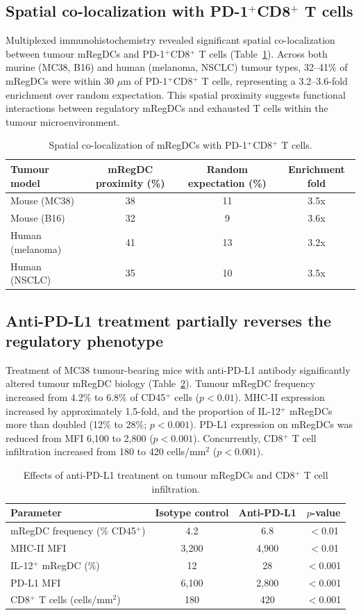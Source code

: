 \documentclass[11pt]{article}
\begin{document}
\subsection{Spatial co-localization with PD-1$^+$CD8$^+$ T cells}
Multiplexed immunohistochemistry revealed significant spatial co-localization between tumour mRegDCs and PD-1$^+$CD8$^+$ T cells (Table~\ref{tab:spatial}). Across both murine (MC38, B16) and human (melanoma, NSCLC) tumour types, 32--41\% of mRegDCs were within 30 $\mu$m of PD-1$^+$CD8$^+$ T cells, representing a 3.2--3.6-fold enrichment over random expectation. This spatial proximity suggests functional interactions between regulatory mRegDCs and exhausted T cells within the tumour microenvironment.

\begin{table}[h]
\centering
\caption{Spatial co-localization of mRegDCs with PD-1$^+$CD8$^+$ T cells.}
\label{tab:spatial}
\begin{tabular}{lccc}
\toprule
Tumour model & mRegDC proximity (\%) & Random expectation (\%) & Enrichment fold \\
\midrule
Mouse (MC38) & 38 & 11 & 3.5x \\
Mouse (B16) & 32 & 9 & 3.6x \\
Human (melanoma) & 41 & 13 & 3.2x \\
Human (NSCLC) & 35 & 10 & 3.5x \\
\bottomrule
\end{tabular}
\end{table}

\subsection{Anti-PD-L1 treatment partially reverses the regulatory phenotype}
Treatment of MC38 tumour-bearing mice with anti-PD-L1 antibody significantly altered tumour mRegDC biology (Table~\ref{tab:treatment}). Tumour mRegDC frequency increased from 4.2\% to 6.8\% of CD45$^+$ cells ($p < 0.01$). MHC-II expression increased by approximately 1.5-fold, and the proportion of IL-12$^+$ mRegDCs more than doubled (12\% to 28\%; $p < 0.001$). PD-L1 expression on mRegDCs was reduced from MFI 6,100 to 2,800 ($p < 0.001$). Concurrently, CD8$^+$ T cell infiltration increased from 180 to 420 cells/mm$^2$ ($p < 0.001$).

\begin{table}[h]
\centering
\caption{Effects of anti-PD-L1 treatment on tumour mRegDCs and CD8$^+$ T cell infiltration.}
\label{tab:treatment}
\begin{tabular}{lccc}
\toprule
Parameter & Isotype control & Anti-PD-L1 & $p$-value \\
\midrule
mRegDC frequency (\% CD45$^+$) & 4.2 & 6.8 & $<$0.01 \\
MHC-II MFI & 3,200 & 4,900 & $<$0.01 \\
IL-12$^+$ mRegDC (\%) & 12 & 28 & $<$0.001 \\
PD-L1 MFI & 6,100 & 2,800 & $<$0.001 \\
CD8$^+$ T cells (cells/mm$^2$) & 180 & 420 & $<$0.001 \\
\bottomrule
\end{tabular}
\end{table}
\end{document}
